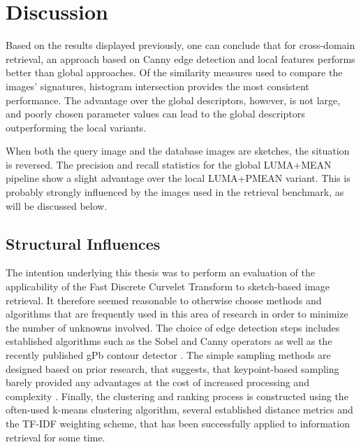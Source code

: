 \chapter{Discussion}\label{ch:discussion}


Based on the results displayed previously, one can conclude that for
cross-domain retrieval, an approach based on Canny edge detection and local
features performs better than global approaches. Of the similarity measures
used to compare the images' signatures, histogram intersection provides the
most consistent performance. 
The advantage over the global descriptors, however, is not large, and poorly
chosen parameter values can lead to the global descriptors outperforming the
local variants.

When both the query image and the database images are sketches, the situation
is reversed. The precision and recall statistics for the global LUMA+MEAN
pipeline show a slight advantage over the local LUMA+PMEAN variant. This is
probably strongly influenced by the images used in the retrieval benchmark, as
will be discussed below.

\section{Structural Influences}

The intention underlying this thesis was to perform an evaluation of the
applicability of the Fast Discrete Curvelet Transform to sketch-based image
retrieval. It therefore seemed reasonable to otherwise choose methods and
algorithms that are frequently used in this area of research in order to
minimize the number of unknowns involved. The choice of edge detection steps
includes established algorithms such as the Sobel and Canny operators as well
as the recently published gPb contour detector
\autocite{arbelaez_contour_2011}. The simple sampling methods are designed
based on prior research, that suggests, that keypoint-based sampling barely
provided any advantages at the cost of increased processing and complexity
\autocite{nowak_sampling_2006}. Finally, the clustering and ranking process is
constructed using the often-used k-means clustering algorithm, several
established distance metrics and the TF-IDF weighting scheme, that has been
successfully applied to information retrieval for some time.

